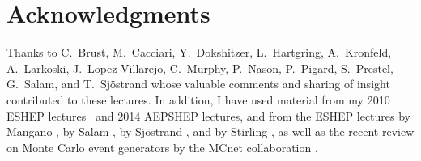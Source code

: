 \documentclass[11pt,pdf]{article}
\begin{document}
\clearpage
\tableofcontents
\clearpage%



\clearpage


\clearpage


\clearpage


\clearpage


\section*{Acknowledgments}
Thanks to C.~Brust, M.~Cacciari, Y.~Dokshitzer, L.~Hartgring, A.~Kronfeld, 
A.~Larkoski, J.~Lopez-Villarejo,
C.~Murphy, P.~Nason, P.~Pigard, S.~Prestel, G.~Salam, and T.~Sj\"ostrand
whose valuable comments and sharing of insight contributed to these lectures. 
In addition, I have used material from my 2010 ESHEP
lectures~\cite{Skands:2011pf} and 2014 AEPSHEP lectures, and from 
the ESHEP lectures by Mangano \cite{Ellis:2009zzb}, by
Salam \cite{Salam:2010zt,Grojean:2010ab}, by Sj\"ostrand \cite{Sjostrand:2006su}, 
and by Stirling \cite{Ellis:2008zzf}, as well as the recent review on
Monte Carlo event generators by the MCnet collaboration \cite{Buckley:2011ms}. 



\section*{}
\clearpage
{}
\printindex
\end{document}
